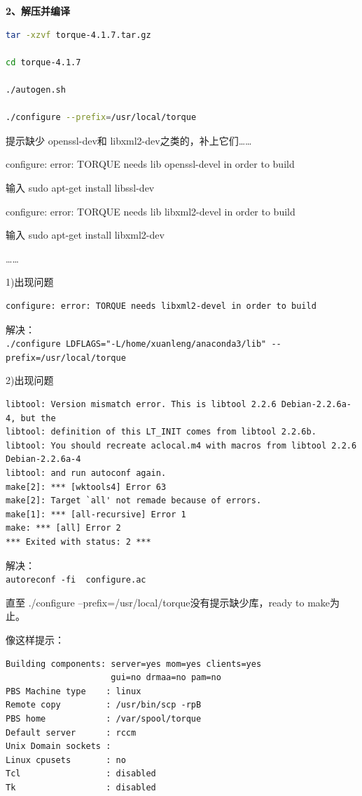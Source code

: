 {\textbf{2、解压并编译}

\begin{lstlisting}[language=sh]
tar -xzvf torque-4.1.7.tar.gz

cd torque-4.1.7

./autogen.sh

./configure --prefix=/usr/local/torque
\end{lstlisting}

提示缺少 openssl-dev和 libxml2-dev之类的，补上它们……

configure: error: TORQUE needs lib openssl-devel in order to build

输入 sudo apt-get install libssl-dev

configure: error: TORQUE needs lib libxml2-devel in order to build

输入 sudo apt-get install libxml2-dev

……

1)出现问题
\begin{verbatim}
configure: error: TORQUE needs libxml2-devel in order to build
\end{verbatim}

解决：\\
\verb|./configure LDFLAGS="-L/home/xuanleng/anaconda3/lib" --prefix=/usr/local/torque|

2)出现问题
\begin{verbatim}
libtool: Version mismatch error. This is libtool 2.2.6 Debian-2.2.6a-4, but the
libtool: definition of this LT_INIT comes from libtool 2.2.6b.
libtool: You should recreate aclocal.m4 with macros from libtool 2.2.6 Debian-2.2.6a-4
libtool: and run autoconf again.
make[2]: *** [wktools4] Error 63
make[2]: Target `all' not remade because of errors.
make[1]: *** [all-recursive] Error 1
make: *** [all] Error 2
*** Exited with status: 2 ***
\end{verbatim}
解决：\\
\verb|autoreconf -fi  configure.ac |



直至 ./configure --prefix=/usr/local/torque没有提示缺少库，ready to make为止。

像这样提示：
\begin{verbatim}
Building components: server=yes mom=yes clients=yes
                     gui=no drmaa=no pam=no
PBS Machine type    : linux
Remote copy         : /usr/bin/scp -rpB
PBS home            : /var/spool/torque
Default server      : rccm
Unix Domain sockets :
Linux cpusets       : no
Tcl                 : disabled
Tk                  : disabled
\end{verbatim}

}
